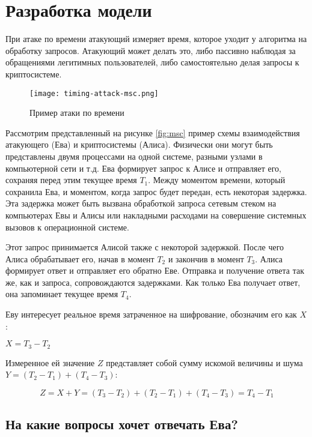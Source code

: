 \section{Разработка модели} \label{sec:timing}

При атаке по времени атакующий измеряет время, которое уходит у
алгоритма на обработку запросов. Атакующий может делать это, либо пассивно
наблюдая за обращениями легитимных пользователей, либо самостоятельно делая
запросы к криптосистеме.

\begin{figure}[h]
    \centering
    \texttt{[image: timing-attack-msc.png]}
    \caption{Пример атаки по времени}
\end{figure} \label{fig:msc}

Рассмотрим представленный на рисунке \ref{fig:msc} пример схемы взаимодействия атакующего (Ева)
и криптосистемы (Алиса). Физически они могут быть представлены двумя процессами на одной
системе, разными узлами в компьютерной сети и т.д. Ева формирует запрос
к Алисе и отправляет его, сохраняя перед этим текущее время $T_1$. Между
моментом времени, который сохранила Ева, и моментом, когда запрос будет передан,
есть некоторая задержка. Эта задержка может быть вызвана обработкой запроса
сетевым стеком на компьютерах Евы и Алисы или накладными расходами на совершение
системных вызовов к операционной системе.

Этот запрос принимается Алисой также с некоторой задержкой. После чего Алиса
обрабатывает его, начав в момент $T_2$ и закончив в момент $T_3$. Алиса
формирует ответ и отправляет его обратно Еве. Отправка и получение ответа так же,
как и запроса, сопровождаются задержками. Как только Ева получает ответ, она
запоминает текущее время $T_4$.

Еву интересует реальное время затраченное на шифрование, обозначим его как $X$ :

$X = T_3 - T_2$

Измеренное ей значение $Z$ представляет собой сумму искомой величины и шума
$Y = (T_2 - T_1) + (T_4 - T_3)$:

\begin{equation}
Z = X + Y = (T_3 - T_2) + (T_2 - T_1) + (T_4 - T_3) = T_4 - T_1
\end{equation} \label{eq:noise}

\subsection{На какие вопросы хочет отвечать Ева?}

